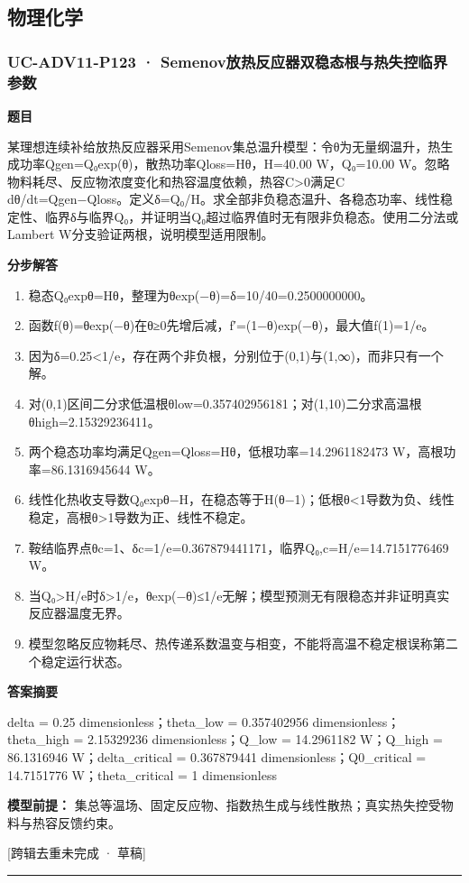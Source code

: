 \documentclass[UTF8,11pt,a4paper]{ctexart}
\begin{document}
\subsection*{物理化学}
\subsubsection*{UC-ADV11-P123 · Semenov放热反应器双稳态根与热失控临界参数}
\noindent\textbf{题目}\par
某理想连续补给放热反应器采用Semenov集总温升模型：令θ为无量纲温升，热生成功率Qgen=Q₀exp(θ)，散热功率Qloss=Hθ，H=40.00 W，Q₀=10.00 W。忽略物料耗尽、反应物浓度变化和热容温度依赖，热容C>0满足C dθ/dt=Qgen−Qloss。定义δ=Q₀/H。求全部非负稳态温升、各稳态功率、线性稳定性、临界δ与临界Q₀，并证明当Q₀超过临界值时无有限非负稳态。使用二分法或Lambert W分支验证两根，说明模型适用限制。\par
\medskip\noindent\textbf{分步解答}
\begin{enumerate}
\item 稳态Q₀expθ=Hθ，整理为θexp(−θ)=δ=10/40=0.2500000000。
\item 函数f(θ)=θexp(−θ)在θ≥0先增后减，f′=(1−θ)exp(−θ)，最大值f(1)=1/e。
\item 因为δ=0.25<1/e，存在两个非负根，分别位于(0,1)与(1,∞)，而非只有一个解。
\item 对(0,1)区间二分求低温根θlow=0.357402956181；对(1,10)二分求高温根θhigh=2.15329236411。
\item 两个稳态功率均满足Qgen=Qloss=Hθ，低根功率=14.2961182473 W，高根功率=86.1316945644 W。
\item 线性化热收支导数Q₀expθ−H，在稳态等于H(θ−1)；低根θ<1导数为负、线性稳定，高根θ>1导数为正、线性不稳定。
\item 鞍结临界点θc=1、δc=1/e=0.367879441171，临界Q₀,c=H/e=14.7151776469 W。
\item 当Q₀>H/e时δ>1/e，θexp(−θ)≤1/e无解；模型预测无有限稳态并非证明真实反应器温度无界。
\item 模型忽略反应物耗尽、热传递系数温变与相变，不能将高温不稳定根误称第二个稳定运行状态。
\end{enumerate}
\noindent\textbf{答案摘要}\par
delta = 0.25 dimensionless；theta\_low = 0.357402956 dimensionless；theta\_high = 2.15329236 dimensionless；Q\_low = 14.2961182 W；Q\_high = 86.1316946 W；delta\_critical = 0.367879441 dimensionless；Q0\_critical = 14.7151776 W；theta\_critical = 1 dimensionless\par
\noindent\textbf{模型前提：}
集总等温场、固定反应物、指数热生成与线性散热；真实热失控受物料与热容反馈约束。\par
\noindent\textcolor{red!65!black}{[跨辑去重未完成 · 草稿]} \par
\medskip\hrule\medskip
{}
\end{document}

